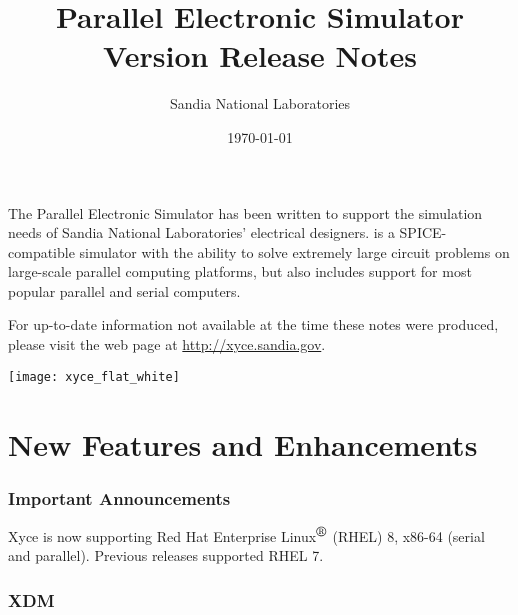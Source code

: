 \documentclass[letterpaper]{scrartcl}
\title{\XyceTitle{} Parallel Electronic Simulator\\
Version \XyceVersionVar{} Release Notes}
\author{ Sandia National Laboratories}
\date{\today}
\begin{document}
\maketitle


The \XyceTM{} Parallel Electronic Simulator has been written to support the
simulation needs of Sandia National Laboratories' electrical designers.
\XyceTM{} is a SPICE-compatible simulator with the ability to solve extremely
large circuit problems on large-scale parallel computing platforms, but also
includes support for most popular parallel and serial computers.

For up-to-date information not available at the time these notes were produced,
please visit the \XyceTM{} web page at
{\color{XyceDeepRed}\url{http://xyce.sandia.gov}}.

\tableofcontents
\vspace*{\fill}
\parbox{\textwidth}
{
  \hfill
  \texttt{[image: xyce\_flat\_white]}
}


\newpage
\section{New Features and Enhancements}

\subsubsection*{Important Announcements}

Xyce is now supporting Red Hat Enterprise Linux${}^{\mbox{\textregistered}}$
(RHEL) 8, x86-64 (serial and parallel). Previous releases supported RHEL 7.

\subsubsection*{XDM}
\begin{XyceItemize}
\item 
\end{XyceItemize}
\end{document}
